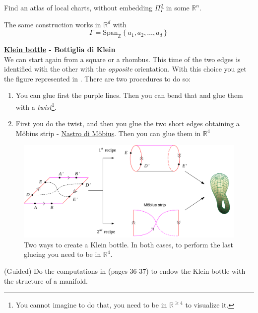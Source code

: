 \documentclass[../main.tex]{subfiles}
\begin{document}
\begin{example}
Find an atlas of local charts, without embedding $\Pi^2_{\Gamma}$ in some $\mathbb{R}^n$. 
\end{example}
\begin{kaobox}[frametitle=Remark]
The same construction works in $\mathbb{R}^d$ with \[
\Gamma=\textrm{Span}_{\mathbb{Z}}\left\{a_1,a_2,\dots,a_d\right\}
\]
\end{kaobox}
\begin{example}
\textbf{\href{https://it.wikipedia.org/wiki/Bottiglia_di_Klein}{Klein bottle} - Bottiglia di Klein}\\
We can start again from a square or a rhombus. This time of the two edges is identified with the other with the \textit{opposite} orientation. With this choice you get the figure represented in . There are two procedures to do so:
\begin{enumerate}
    \item You can glue first the purple lines. Then you can bend that and glue them with a \textit{twist}\footnote{You cannot imagine to do that, you need to be in $\mathbb{R}^{\geq 4}$ to visualize it.}.
    \item First you do the twist, and then you glue the two short edges obtaining a Möbius strip - \href{https://it.wikipedia.org/wiki/Nastro_di_M\%C3\%B6bius}{Nastro di Möbius}. Then you can glue them in $\mathbb{R}^4$
\end{enumerate}
\end{example}
\begin{figure}[h!]
	\includegraphics{images/klein_bottle.pdf}
	\caption[How to construct a Klein Bottle]{Two ways to create a Klein bottle. In both cases, to perform the last glueing you need to be in $\mathbb{R}^4$.}
\end{figure}
\begin{example}
(Guided) Do the computations in  (pages 36-37) to endow the Klein bottle with the structure of a manifold.
\end{example}
\end{document}
